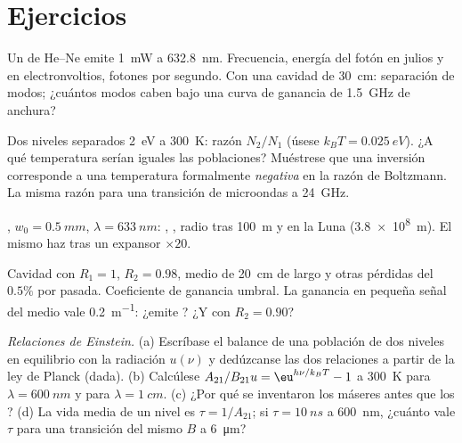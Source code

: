 \section{Ejercicios}

\begin{exercise}[$\star$]\label{exo:b2:laser:1}
Un  de He--Ne emite \qty{1}{mW} a \qty{632.8}{nm}. Frecuencia, energía
del fotón en julios y en electronvoltios, fotones por segundo. Con una cavidad de
\qty{30}{cm}: separación de modos; ¿cuántos modos caben bajo una curva de ganancia
de \qty{1.5}{GHz} de anchura?
\end{exercise}

\begin{exercise}[$\star$]\label{exo:b2:laser:2}
Dos niveles separados \qty{2}{eV} a \qty{300}{K}: razón $N_2/N_1$ (úsese
$k_BT = \qty{0.025}{eV}$). ¿A qué temperatura serían iguales las poblaciones?
Muéstrese que una inversión corresponde a una temperatura formalmente \emph{negativa}
en la razón de Boltzmann. La misma razón para una transición de microondas
a \qty{24}{GHz}.
\end{exercise}

\begin{exercise}[$\star$]\label{exo:b2:laser:3}
, $w_0 = \qty{0.5}{mm}$, $\lambda = \qty{633}{nm}$: , , radio tras \qty{100}{m} y en la Luna
(\qty{3.8e8}{m}). El mismo haz tras un expansor $\times 20$.
\end{exercise}

\begin{exercise}[$\star$]\label{exo:b2:laser:4}
Cavidad con $R_1 = 1$, $R_2 = 0.98$, medio de \qty{20}{cm} de largo y otras
pérdidas del $0.5\%$ por pasada. Coeficiente de ganancia umbral. La ganancia en
pequeña señal del medio vale \qty{0.2}{m^{-1}}: ¿emite ? ¿Y con
$R_2 = 0.90$?
\end{exercise}

\begin{exercise}[$\star\star$]\label{exo:b2:laser:5}
\emph{Relaciones de Einstein.} (a) Escríbase el balance de una población de dos
niveles en equilibrio con la radiación $u(\nu)$ y dedúzcanse las dos
relaciones a partir de la ley de Planck (dada). (b) Calcúlese
$A_{21}/B_{21}u = \eu^{h\nu/k_BT} - 1$ a \qty{300}{K} para
$\lambda = \qty{600}{nm}$ y para $\lambda = \qty{1}{cm}$. (c) ¿Por qué se
inventaron los máseres antes que los ? (d) La vida media de un nivel es
$\tau = 1/A_{21}$; si $\tau = \qty{10}{ns}$ a \qty{600}{nm}, ¿cuánto vale
$\tau$ para una transición del mismo $B$ a \qty{6}{\micro m}?
\end{exercise}

